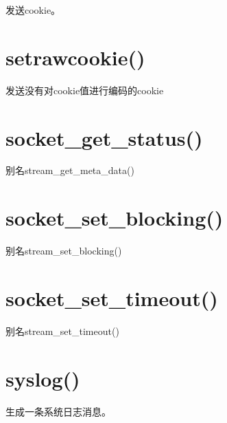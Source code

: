 发送cookie。

\section{setrawcookie()}

发送没有对cookie值进行编码的cookie


\section{socket\_get\_status()}

别名stream\_get\_meta\_data()

\section{socket\_set\_blocking()}

别名stream\_set\_blocking()

\section{socket\_set\_timeout()}

别名stream\_set\_timeout()

\section{syslog()}

生成一条系统日志消息。


















